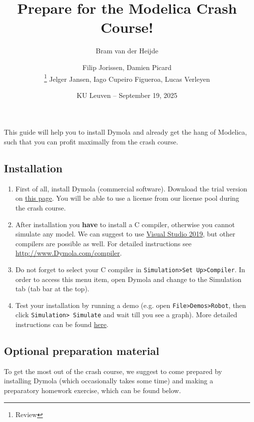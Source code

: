 \documentclass[10pt,a4paper]{article}
\author{Bram van der Heijde}
\begin{document}
	
	\title{Prepare for the Modelica Crash Course!}
	\author{Filip Jorissen, Damien Picard\\ \thanks{Review} Jelger Jansen, Iago Cupeiro Figueroa, Lucas Verleyen} 
	\date{KU Leuven -- September 19, 2025}
	\maketitle

This guide will help you to install Dymola and already get the hang of Modelica, such that you can profit maximally from the crash course. 

\subsection*{Installation}

\begin{enumerate}
	\item First of all, install Dymola (commercial software).  Download the trial version on
	\href{https://www.3ds.com/products-services/catia/products/dymola/trial-version/}{this page}. You will be able to use a license from our license pool during the crash course. 
	\item After installation you \textbf{have} to install a C compiler, otherwise you 
	cannot simulate any model. We can suggest to use \href{https://visualstudio.microsoft.com/fr/vs/older-downloads/}{Visual Studio 2019}, but other compilers are possible as well. For detailed instructions see
	\href{http://www.Dymola.com/compiler}{http://www.Dymola.com/compiler}. 
	\item Do not forget to select your C compiler in \texttt{Simulation>Set Up>Compiler}. In order to access this menu item, open Dymola and change to the Simulation tab (tab bar at the top).
	\item Test your installation by running a demo (e.g. open \texttt{File>Demos>Robot}, then 
	click \texttt{Simulation> Simulate} and wait till you see a graph). More detailed instructions can be found \href{https://www.3ds.com/fileadmin/PRODUCTS/CATIA/DYMOLA/PDF/Installation.pdf}{here}.
\end{enumerate}


\subsection*{Optional preparation material}
To get the most out of the crash course, we suggest to come prepared by installing Dymola (which occasionally takes some time) and making a preparatory homework exercise, which can be found below. 
\end{document}
